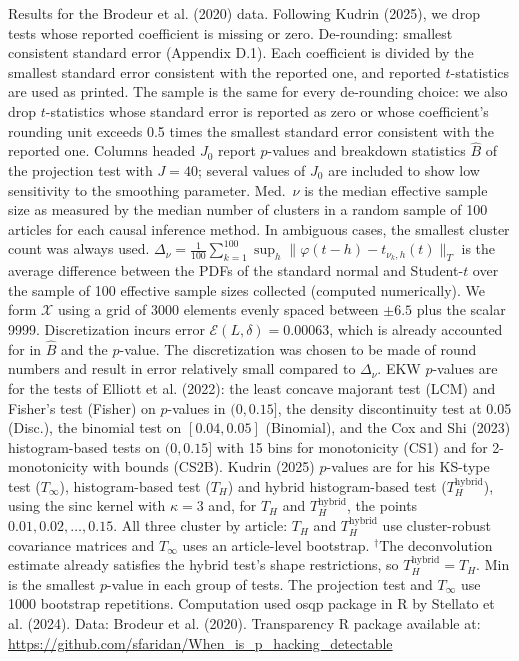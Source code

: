 \begin{table}[htbp]
\medskip
\begin{minipage}{\linewidth}
Results for the Brodeur et al. (2020) data. Following Kudrin (2025), we drop tests whose reported coefficient is missing or zero.
De-rounding: smallest consistent standard error (Appendix D.1). Each coefficient is divided by the smallest standard error consistent with the reported one, and reported $t$-statistics are used as printed.
The sample is the same for every de-rounding choice: we also drop $t$-statistics whose standard error is reported as zero or whose coefficient's rounding unit exceeds 0.5 times the smallest standard error consistent with the reported one.
Columns headed $J_0$ report $p$-values and breakdown statistics $\widehat{B}$ of the projection test with $J=40$; several values of $J_0$ are included to show low sensitivity to the smoothing parameter.
Med.\ $\nu$ is the median effective sample size as measured by the median number of clusters in a random sample of 100 articles for each causal inference method.
In ambiguous cases, the smallest cluster count was always used.
$\Delta_\nu=\frac{1}{100}\sum_{k=1}^{100}\sup_h\|\varphi(t-h)-t_{\nu_k,h}(t)\|_T$ is the average difference between the PDFs of the standard normal and Student-$t$ over the sample of 100 effective sample sizes collected (computed numerically).
We form $\mathcal{X}$ using a grid of 3000 elements evenly spaced between $\pm 6.5$ plus the scalar 9999.
Discretization incurs error $\mathcal{E}(L,\delta)=0.00063$, which is already accounted for in $\widehat{B}$ and the $p$-value.
The discretization was chosen to be made of round numbers and result in error relatively small compared to $\Delta_\nu$.
EKW $p$-values are for the tests of Elliott et al. (2022): the least concave majorant test (LCM) and Fisher's test (Fisher) on $p$-values in $(0,0.15]$, the density discontinuity test at 0.05 (Disc.), the binomial test on $[0.04,0.05]$ (Binomial), and the Cox and Shi (2023) histogram-based tests on $(0,0.15]$ with 15 bins for monotonicity (CS1) and for 2-monotonicity with bounds (CS2B).
Kudrin (2025) $p$-values are for his KS-type test ($T_\infty$), histogram-based test ($T_H$) and hybrid histogram-based test ($T_H^{\mathrm{hybrid}}$), using the sinc kernel with $\kappa=3$ and, for $T_H$ and $T_H^{\mathrm{hybrid}}$, the points $0.01,0.02,\ldots,0.15$.
All three cluster by article: $T_H$ and $T_H^{\mathrm{hybrid}}$ use cluster-robust covariance matrices and $T_\infty$ uses an article-level bootstrap.
$^\dagger$The deconvolution estimate already satisfies the hybrid test's shape restrictions, so $T_H^{\mathrm{hybrid}}=T_H$.
Min is the smallest $p$-value in each group of tests.
The projection test and $T_\infty$ use 1000 bootstrap repetitions.
Computation used osqp package in R by Stellato et al. (2024). Data: Brodeur et al. (2020).
Transparency R package available at: \url{https://github.com/sfaridan/When_is_p_hacking_detectable}
\end{minipage}
\end{table}
